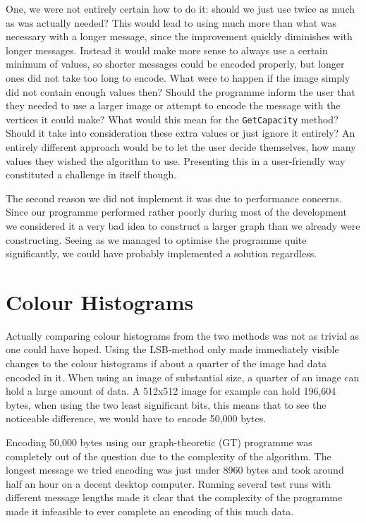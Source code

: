 One, we were not entirely certain how to do it: should we just use twice as much as was actually needed?
This would lead to using much more than what was necessary with a longer message, since the improvement quickly diminishes with longer messages.
Instead it would make more sense to always use a certain minimum of values, so shorter messages could be encoded properly, but longer ones did not take too long to encode.
What were to happen if the image simply did not contain enough values then? 
Should the programme inform the user that they needed to use a larger image or attempt to encode the message with the vertices it could make?
What would this mean for the \lstinline|GetCapacity| method? 
Should it take into consideration these extra values or just ignore it entirely?
An entirely different approach would be to let the user decide themselves, how many values they wished the algorithm to use. 
Presenting this in a user-friendly way constituted a challenge in itself though.

The second reason we did not implement it was due to performance concerns.
Since our programme performed rather poorly during most of the development we considered it a very bad idea to construct a larger graph than we already were constructing.
Seeing as we managed to optimise the programme quite significantly, we could have probably implemented a solution regardless.


\section{Colour Histograms}
\label{sec:colourhistograms}
Actually comparing colour histograms from the two methods was not as trivial as one could have hoped.
Using the LSB-method only made immediately visible changes to the colour histograms if about a quarter of the image had data encoded in it.
When using an image of substantial size, a quarter of an image can hold a large amount of data. 
A 512x512 image for example can hold 196,604 bytes, when using the two least significant bits, this means that to see the noticeable difference, we would have to encode 50,000 bytes.

Encoding 50,000 bytes using our graph-theoretic (GT) programme was completely out of the question due to the complexity of the algorithm.
The longest message we tried encoding was just under 8960 bytes and took around half an hour on a decent desktop computer.
Running several test runs with different message lengths made it clear that the complexity of the programme made it infeasible to ever complete an encoding of this much data.

